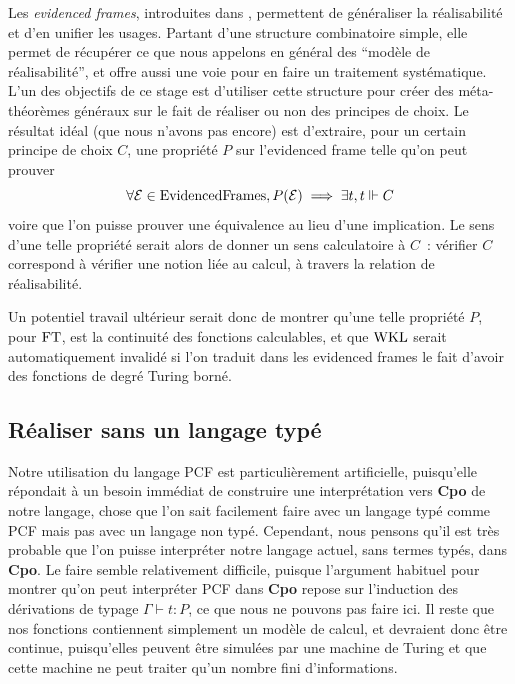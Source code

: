 \documentclass{article}
\begin{document}
Les \textit{evidenced frames}, introduites dans \cite{DBLP:conf/lics/0001MT21}, permettent de généraliser la réalisabilité et d'en unifier les usages. Partant d'une structure combinatoire simple, elle permet de récupérer ce que nous appelons en général des ``modèle de réalisabilité'', et offre aussi une voie pour en faire un traitement systématique. L'un des objectifs de ce stage est d'utiliser cette structure pour créer des méta-théorèmes généraux sur le fait de réaliser ou non des principes de choix. Le résultat idéal (que nous n'avons pas encore) est d'extraire, pour un certain principe de choix $C$, une propriété $P$ sur l'evidenced frame telle qu'on peut prouver
\[\forall \mathcal E \in \mathrm{Evidenced Frames}, P(\mathcal E) \implies \exists t, t\Vdash C\]
voire que l'on puisse prouver une équivalence au lieu d'une implication. Le sens d'une telle propriété serait alors de donner un sens calculatoire à $C$~: vérifier $C$ correspond à vérifier une notion liée au calcul, à travers la relation de réalisabilité.

Un potentiel travail ultérieur serait donc de montrer qu'une telle propriété $P$, pour $\mathrm{FT}$, est la continuité des fonctions calculables, et que $\mathrm{WKL}$ serait automatiquement invalidé si l'on traduit dans les evidenced frames le fait d'avoir des fonctions de degré Turing borné.

\subsection{Réaliser sans un langage typé}

Notre utilisation du langage PCF est particulièrement artificielle, puisqu'elle répondait à un besoin immédiat de construire une interprétation vers \textbf{Cpo} de notre langage, chose que l'on sait facilement faire avec un langage typé comme PCF mais pas avec un langage non typé. Cependant, nous pensons qu'il est très probable que l'on puisse interpréter notre langage actuel, sans termes typés, dans \textbf{Cpo}. Le faire semble relativement difficile, puisque l'argument habituel pour montrer qu'on peut interpréter PCF dans \textbf{Cpo} repose sur l'induction des dérivations de typage $\Gamma\vdash t : P$, ce que nous ne pouvons pas faire ici. Il reste que nos fonctions contiennent simplement un modèle de calcul, et devraient donc être continue, puisqu'elles peuvent être simulées par une machine de Turing et que cette machine ne peut traiter qu'un nombre fini d'informations.

\appendix
\end{document}
